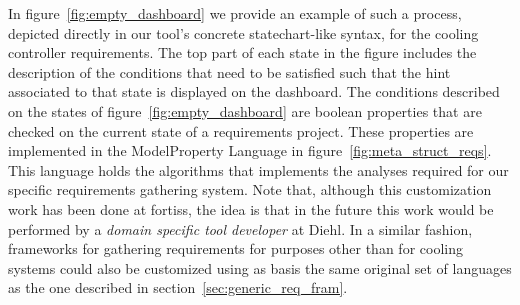 In figure~\ref{fig:empty_dashboard} we provide an example of such a process,
depicted directly in our tool's concrete statechart-like syntax, for the cooling
controller requirements. The top part of each state in the figure includes the description
of the conditions that need to be satisfied such that the hint associated to
that state is displayed on the dashboard. The conditions described on the states
of figure~\ref{fig:empty_dashboard} are boolean properties that are checked on
the current state of a requirements project. These properties are implemented in
the \textsf{ModelProperty} Language in figure~\ref{fig:meta_struct_reqs}. This
language holds the algorithms that implements the analyses required for our
specific requirements gathering system.
Note that, although this customization work has been done at fortiss, the idea
is that in the future this work would be performed by a \emph{domain specific
tool developer} at Diehl. In a similar fashion, frameworks for gathering
requirements for purposes other than for cooling systems could also be
customized using as basis the same original set of languages as the one
described in section~\ref{sec:generic_req_fram}.
\vspace{-.3cm}





